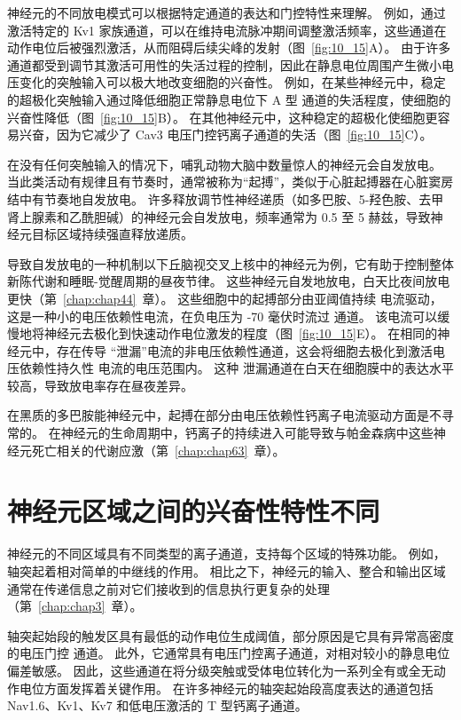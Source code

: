 神经元的不同放电模式可以根据特定通道的表达和门控特性来理解。
例如，通过激活特定的 Kv1 家族通道，可以在维持电流脉冲期间调整激活频率，这些通道在动作电位后被强烈激活，从而阻碍后续尖峰的发射（图~\ref{fig:10_15}A）。
由于许多通道都受到调节其激活可用性的失活过程的控制，因此在静息电位周围产生微小电压变化的突触输入可以极大地改变细胞的兴奋性。
例如，在某些神经元中，稳定的超极化突触输入通过降低细胞正常静息电位下 A 型  通道的失活程度，使细胞的兴奋性降低（图~\ref{fig:10_15}B）。
在其他神经元中，这种稳定的超极化使细胞更容易兴奋，因为它减少了 Cav3 电压门控钙离子通道的失活（图~\ref{fig:10_15}C）。


在没有任何突触输入的情况下，哺乳动物大脑中数量惊人的神经元会自发放电。
当此类活动有规律且有节奏时，通常被称为“起搏”，类似于心脏起搏器在心脏窦房结中有节奏地自发放电。
许多释放调节性神经递质（如多巴胺、5-羟色胺、去甲肾上腺素和乙酰胆碱）的神经元会自发放电，频率通常为 0.5 至 5 赫兹，导致神经元目标区域持续强直释放递质。


导致自发放电的一种机制以下丘脑视交叉上核中的神经元为例，它有助于控制整体新陈代谢和睡眠-觉醒周期的昼夜节律。
这些神经元自发地放电，白天比夜间放电更快（第~\ref{chap:chap44}~章）。 
这些细胞中的起搏部分由亚阈值持续  电流驱动，这是一种小的电压依赖性电流，在负电压为 -70 毫伏时流过  通道。
该电流可以缓慢地将神经元去极化到快速动作电位激发的程度（图~\ref{fig:10_15}E）。
在相同的神经元中，存在传导 “泄漏”电流的非电压依赖性通道，这会将细胞去极化到激活电压依赖性持久性  电流的电压范围内。
这种  泄漏通道在白天在细胞膜中的表达水平较高，导致放电率存在昼夜差异。


在黑质的多巴胺能神经元中，起搏在部分由电压依赖性钙离子电流驱动方面是不寻常的。
在神经元的生命周期中，钙离子的持续进入可能导致与帕金森病中这些神经元死亡相关的代谢应激（第~\ref{chap:chap63}~章）。



\section{神经元区域之间的兴奋性特性不同}

神经元的不同区域具有不同类型的离子通道，支持每个区域的特殊功能。
例如，轴突起着相对简单的中继线的作用。
相比之下，神经元的输入、整合和输出区域通常在传递信息之前对它们接收到的信息执行更复杂的处理（第~\ref{chap:chap3}~章）。


轴突起始段的触发区具有最低的动作电位生成阈值，部分原因是它具有异常高密度的电压门控  通道。
此外，它通常具有电压门控离子通道，对相对较小的静息电位偏差敏感。
因此，这些通道在将分级突触或受体电位转化为一系列全有或全无动作电位方面发挥着关键作用。
在许多神经元的轴突起始段高度表达的通道包括 Nav1.6、Kv1、Kv7 和低电压激活的 T 型钙离子通道。



